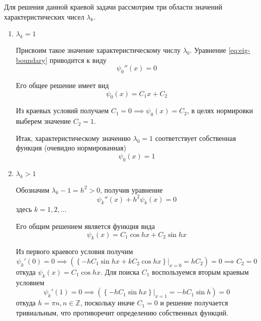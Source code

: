 \documentclass{article}
\numberwithin{equation}{section}
\providecommand{\at}[2]{\left. {#1}\right\vert_{#2}}
\providecommand{\set}[1]{\mathbb{#1}}
\begin{document}
Для решения данной краевой задачи рассмотрим три области значений
характеристических чисел $\lambda_k$.
\begin{enumerate}
\item $\lambda_k=1$

  Присвоим такое значение характеристическому числу $\lambda_0$.
  Уравнение \eqref{eq:eig-boundary} приводится к виду
  \begin{equation*}
    \psi_0''(x)=0
  \end{equation*}

  Его общее решение имеет вид
  \begin{equation*}
    \psi_0(x) = C_1x+C_2
  \end{equation*}

  Из краевых условий получаем $C_1=0 \implies \psi_0(x) = C_2$, в целях
  нормировки выберем значение $C_2 = 1$.

  Итак, характеристическому значению $\lambda_0=1$ соответствует
  собственная функция (очевидно нормированная)
  \begin{equation*}
    \psi_0(x) = 1
  \end{equation*}

\item $\lambda_k > 1$
  
  Обозначим $\lambda_k-1 = h^2 > 0$, получив уравнение
  \begin{equation*}
    \psi_k''(x)+h^2\psi_k(x) = 0
  \end{equation*}
  здесь $k = 1, 2, \dotsc$

  Его общим решением является функция вида
  \begin{equation*}
    \psi_k(x) = C_1 \cos{hx} + C_2 \sin{hx}
  \end{equation*}

  Из первого краевого условия получим
  \begin{equation*}
    \psi_k'(0) = 0 \implies \left( \at{\left \{ -h C_1 \sin{hx} + k C_2 \cos{hx} \right \}}{x=0} =
      h C_2 \right) = 0 \implies C_2 = 0
  \end{equation*}
  откуда $\psi_k(x) = C_1 \cos{hx}$. Для поиска $C_1$ воспользуемся
  вторым краевым условием
  \begin{equation*}
    \psi_k'(1) = 0 \implies \left( \at{\left \{ -h C_1 \sin{hx} \right \}}{x=1} =
      - h C_1 \sin{h} \right) = 0
  \end{equation*}
  откуда $h = \pi n, n \in \set{Z}$, поскольку иначе $C_1 = 0$ и
  решение получается тривиальным, что противоречит определению
  собственных функций.


\end{enumerate}
\end{document}
